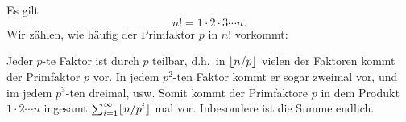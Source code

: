 \section{}





\subsection{}

Es gilt
\[
    n!
  = 1 \cdot 2 \cdot 3 \dotsm n.
\]
Wir zählen, wie häufig der Primfaktor $p$ in $n!$ vorkommt:

Jeder $p$-te Faktor ist durch $p$ teilbar, d.h.\ in $\lfloor n/p\rfloor$ vielen der Faktoren kommt der Primfaktor $p$ vor.
In jedem $p^2$-ten Faktor kommt er sogar zweimal vor, und im jedem $p^3$-ten dreimal, usw.
Somit kommt der Primfaktore $p$ in dem Produkt $1 \cdot 2 \dotsm n$ ingesamt $\sum_{i=1}^\infty \lfloor n/p^i\rfloor$ mal vor.
Inbesondere ist die Summe endlich.





\subsection{}


